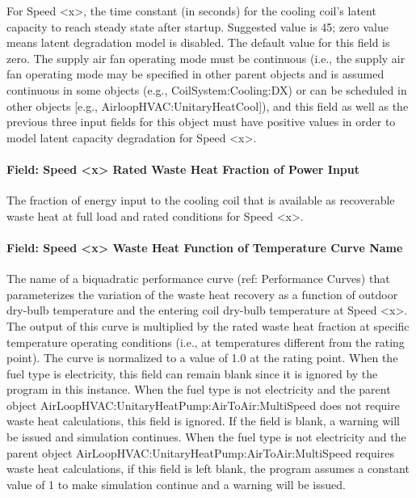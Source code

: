 For Speed \textless{}x\textgreater{}, the time constant (in seconds) for the cooling coil's latent capacity to reach steady state after startup. Suggested value is 45; zero value means latent degradation model is disabled. The default value for this field is zero. The supply air fan operating mode must be continuous (i.e., the supply air fan operating mode may be specified in other parent objects and is assumed continuous in some objects (e.g., CoilSystem:Cooling:DX) or can be scheduled in other objects {[}e.g., AirloopHVAC:UnitaryHeatCool{]}), and this field as well as the previous three input fields for this object must have positive values in order to model latent capacity degradation for Speed \textless{}x\textgreater{}.

\paragraph{Field: Speed \textless{}x\textgreater{} Rated Waste Heat Fraction of Power Input}\label{field-speed-x-rated-waste-heat-fraction-of-power-input}

The fraction of energy input to the cooling coil that is available as recoverable waste heat at full load and rated conditions for Speed \textless{}x\textgreater{}.

\paragraph{Field: Speed \textless{}x\textgreater{} Waste Heat Function of Temperature Curve Name}\label{field-speed-x-waste-heat-function-of-temperature-curve-name}

The name of a biquadratic performance curve (ref: Performance Curves) that parameterizes the variation of the waste heat recovery as a function of outdoor dry-bulb temperature and the entering coil dry-bulb temperature at Speed \textless{}x\textgreater{}. The output of this curve is multiplied by the rated waste heat fraction at specific temperature operating conditions (i.e., at temperatures different from the rating point). The curve is normalized to a value of 1.0 at the rating point. When the fuel type is electricity, this field can remain blank since it is ignored by the program in this instance. When the fuel type is not electricity and the parent object AirLoopHVAC:UnitaryHeatPump:AirToAir:MultiSpeed does not require waste heat calculations, this field is ignored. If the field is blank, a warning will be issued and simulation continues. When the fuel type is not electricity and the parent object AirLoopHVAC:UnitaryHeatPump:AirToAir:MultiSpeed requires waste heat calculations, if this field is left blank, the program assumes a constant value of 1 to make simulation continue and a warning will be issued.

